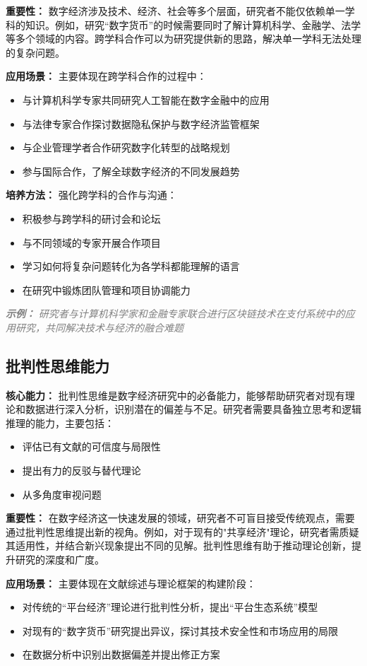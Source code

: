 \documentclass[lang=cn,12pt,a4paper]{elegantpaper}
\newcommand{\skillexample}[1]{\smallskip\noindent\textcolor{gray}{\textit{\footnotesize\textbf{示例：}} \textit{\footnotesize #1}}}
\begin{document}
{\textbf{重要性：}} 数字经济涉及技术、经济、社会等多个层面，研究者不能仅依赖单一学科的知识。例如，研究“数字货币”的时候需要同时了解计算机科学、金融学、法学等多个领域的内容。跨学科合作可以为研究提供新的思路，解决单一学科无法处理的复杂问题。

{\textbf{应用场景：}} 主要体现在跨学科合作的过程中：
\begin{itemize}
    \item 与计算机科学专家共同研究人工智能在数字金融中的应用
    \item 与法律专家合作探讨数据隐私保护与数字经济监管框架
    \item 与企业管理学者合作研究数字化转型的战略规划
    \item 参与国际合作，了解全球数字经济的不同发展趋势
\end{itemize}

{\textbf{培养方法：}} 强化跨学科的合作与沟通：
\begin{itemize}
    \item 积极参与跨学科的研讨会和论坛
    \item 与不同领域的专家开展合作项目
    \item 学习如何将复杂问题转化为各学科都能理解的语言
    \item 在研究中锻炼团队管理和项目协调能力
\end{itemize}

\skillexample{研究者与计算机科学家和金融专家联合进行区块链技术在支付系统中的应用研究，共同解决技术与经济的融合难题}

\subsection{批判性思维能力}
{\textbf{核心能力：}} 批判性思维是数字经济研究中的必备能力，能够帮助研究者对现有理论和数据进行深入分析，识别潜在的偏差与不足。研究者需要具备独立思考和逻辑推理的能力，主要包括：
\begin{itemize}
    \item 评估已有文献的可信度与局限性
    \item 提出有力的反驳与替代理论
    \item 从多角度审视问题
\end{itemize}

{\textbf{重要性：}} 在数字经济这一快速发展的领域，研究者不可盲目接受传统观点，需要通过批判性思维提出新的视角。例如，对于现有的"共享经济"理论，研究者需质疑其适用性，并结合新兴现象提出不同的见解。批判性思维有助于推动理论创新，提升研究的深度和广度。

{\textbf{应用场景：}} 主要体现在文献综述与理论框架的构建阶段：
\begin{itemize}
    \item 对传统的“平台经济”理论进行批判性分析，提出“平台生态系统”模型
    \item 对现有的“数字货币”研究提出异议，探讨其技术安全性和市场应用的局限
    \item 在数据分析中识别出数据偏差并提出修正方案
\end{itemize}
\end{document}
